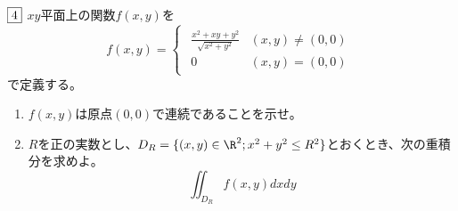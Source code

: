 \documentclass[dvipdfmx]{jsreport}
\begin{document}
\begin{tcolorbox} %
	$\fbox{4}$ $xy$平面上の関数$f(x, y)$を
\begin{equation*}
	f(x, y)= 
\begin{cases}
\begin{matrix}
	\frac{x^2+ xy+ y^2}{\sqrt{x^2+ y^2}}& (x, y)\ne (0 ,0)\\
	0& (x, y)= (0, 0)
\end{matrix}
\end{cases}
\end{equation*}
	で定義する。
\begin{enumerate}
	\item $f(x, y)$は原点$(0, 0)$で連続であることを示せ。
	\item $R$を正の実数とし、$D_R= \{(x, y)\in \R^2; x^2+ y^2\le R^2\}$とおくとき、次の重積分を求めよ。
\begin{equation*}
	\iint_{D_R} f(x, y) dxdy
\end{equation*}
\end{enumerate}
\end{tcolorbox}
\end{document}
